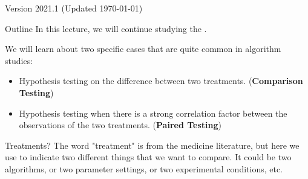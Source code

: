 \documentclass[aspectratio=169]{beamer}
\subtitle[Statistical Inference]{Topic 04 - Paired Comparison}
\date{}
\begin{document}
\begin{CJK}{UTF8}{ipxm}

\begin{frame}
  \maketitle

  \vfill

  \hfill \tiny{Version 2021.1 (Updated \today)}
\end{frame}

\begin{frame}[t]{Outline}
  In this lecture, we will continue studying the . \bigskip

  We will learn about two specific cases that are quite common in algorithm studies:\bigskip

  \begin{itemize}
    \item Hypothesis testing on the difference between two treatments. ({\bf Comparison Testing})\medskip
    \item Hypothesis testing when there is a strong correlation factor between the observations of the two treatments. ({\bf Paired Testing})
  \end{itemize}
  \vfill

  \begin{block}{Treatments?}
    {\smaller
    The word "treatment" is from the medicine literature, but here we use to indicate two different things that we want to compare. It could be two algorithms, or two parameter settings, or two experimental conditions, etc.
    }
  \end{block}
\end{frame}







\end{CJK}
\end{document}
